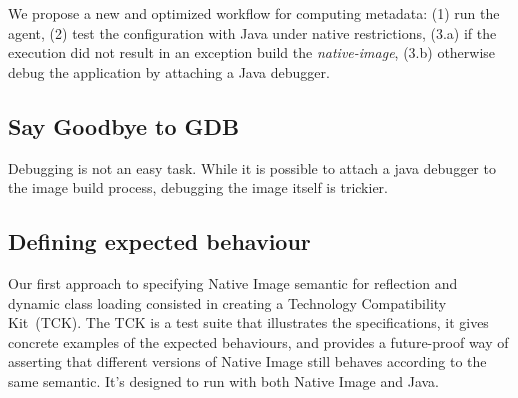 We propose a new and optimized workflow for computing metadata: (1) run the agent, (2) test the configuration with Java under native restrictions, (3.a) if the execution did not result in an exception build the \textit{native-image}, (3.b) otherwise debug the application by attaching a Java debugger.

\subsection{Say Goodbye to GDB}
Debugging is not an easy task. While it is possible to attach a java debugger to the image build process, debugging the image itself is trickier.


\subsection{Defining expected behaviour}
Our first approach to specifying Native Image semantic for reflection and dynamic class loading consisted in creating a Technology Compatibility Kit~(TCK). The TCK is a test suite that illustrates the specifications, it gives concrete examples of the expected behaviours, and provides a future-proof way of asserting that different versions of Native Image still behaves according to the same semantic.
It's designed to run with both Native Image and Java.


